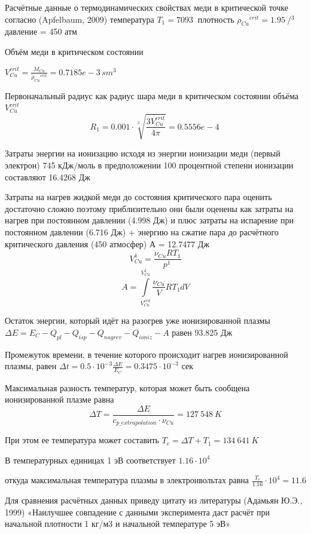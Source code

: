 ﻿\documentclass[12pt, letterpaper]{article}
\begin{document}
Расчётные данные о термодинамических свойствах меди в критической точке согласно (Apfelbaum, 2009) температура ${{T}_{1}}=7093\ $ плотность ${{\rho }_{Cu}}^{crit}=1.95\ {}/{{{}^{3}}}$ давление = 450 атм

Объём меди в критическом состоянии

$V_{Cu}^{crit}=\frac{{{M}_{Cu}}}{{{\rho }_{Cu}}^{crit}}={0.7185e-3}\,{sm}^{3}$

Первоначальный радиус как радиус шара меди в критическом состоянии объёма $V_{Cu}^{crit}$
$${{R}_{1}}=0.001\cdot \sqrt[3]{\frac{3V_{Cu}^{crit}}{4\pi }}={0.5556e-4}\ $$ 

Затраты энергии на ионизацию исходя из энергии ионизации меди (первый электрон) 745 кДж/моль в предположении 100 процентной степени ионизации составляют 16.4268 Дж

Затраты на нагрев жидкой меди до состояния критического пара оценить достаточно сложно поэтому приблизительно они были оценены как затраты на нагрев при постоянном давлении (4.998 Дж) и плюс затраты на испарение при постоянном давлении (6.716 Дж) + энергию на сжатие пара до расчётного критического давления (450 атмосфер) А = 12.7477 Дж
$$V_{Cu}^{1\ }=\frac{{{\nu }_{Cu}}R{{T}_{1}}}{{{p}^{1\ }}}$$
$$A=\int\limits_{V_{Cu}^{crit}}^{V_{Cu}^{1\ }}{\frac{{{\nu }_{Cu}}}{V}R{{T}_{1}}dV}$$

Остаток энергии, который идёт на разогрев уже ионизированной плазмы
$\Delta E={{E}_{C}}-{{Q}_{pl}}-{{Q}_{isp}}-{{Q}_{nagrev}}-{{Q}_{ioniz}}-A$ 
равен 93.825 Дж

Промежуток времени, в течение которого происходит нагрев ионизированной плазмы, равен 
$\Delta t=0.5\cdot {{10}^{-3}}\frac{\Delta E}{{{E}_{C}}}=0.3475\cdot {{10}^{-3}}$ сек

Максимальная разность температур, которая может быть сообщена ионизированной плазме равна \[\Delta T=\frac{\Delta E}{{{c}_{p\_extrapolation}}\cdot {{\nu }_{Cu}}}=127\ 548\ K\] 

При этом ее температура может составить ${{T}_{e}}=\Delta T+{{T}_{1}}=134\ 641\ K$ 

В температурных единицах 1 эВ соответствует ${1.16}\cdot{{10}^{4}}\ $

откуда максимальная температура плазмы в электронвольтах равна $\frac{{{T}_{e}}}{1.16}\cdot{{10}^{4}}=11.6$ 

Для сравнения расчётных данных приведу цитату из литературы (Адамьян Ю.Э., 1999) «Наилучшее совпадение с данными эксперимента даст расчёт при начальной плотности 1 кг/м3 и начальной температуре 5 эВ»
\end{document}
